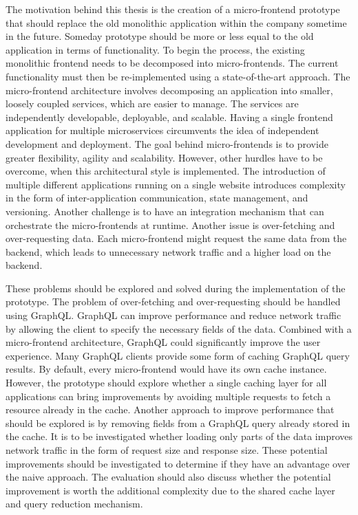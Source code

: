 The motivation behind this thesis is the creation of a micro-frontend prototype that should replace the old monolithic application within the company sometime in the future. Someday prototype should be more or less equal to the old application in terms of functionality. To begin the process, the existing monolithic frontend needs to be decomposed into micro-frontends. The current functionality must then be re-implemented using a state-of-the-art approach. The micro-frontend architecture involves decomposing an application into smaller, loosely coupled services, which are easier to manage. The services are independently developable, deployable, and scalable. Having a single frontend application for multiple microservices circumvents the idea of independent development and deployment. The goal behind micro-frontends is to provide greater flexibility, agility and scalability. However, other hurdles have to be overcome, when this architectural style is implemented. The introduction of multiple different applications running on a single website introduces complexity in the form of inter-application communication, state management, and versioning. Another challenge is to have an integration mechanism that can orchestrate the micro-frontends at runtime. Another issue is over-fetching and over-requesting data. Each micro-frontend might request the same data from the backend, which leads to unnecessary network traffic and a higher load on the backend.

\bigskip

\noindent These problems should be explored and solved during the implementation of the prototype. The problem of over-fetching and over-requesting should be handled using GraphQL. GraphQL can improve performance and reduce network traffic by allowing the client to specify the necessary fields of the data. Combined with a micro-frontend architecture, GraphQL could significantly improve the user experience. Many GraphQL clients provide some form of caching GraphQL query results. By default, every micro-frontend would have its own cache instance. However, the prototype should explore whether a single caching layer for all applications can bring improvements by avoiding multiple requests to fetch a resource already in the cache. Another approach to improve performance that should be explored is by removing fields from a GraphQL query already stored in the cache. It is to be investigated whether loading only parts of the data improves network traffic in the form of request size and response size. These potential improvements should be investigated to determine if they have an advantage over the naive approach. The evaluation should also discuss whether the potential improvement is worth the additional complexity due to the shared cache layer and query reduction mechanism.

